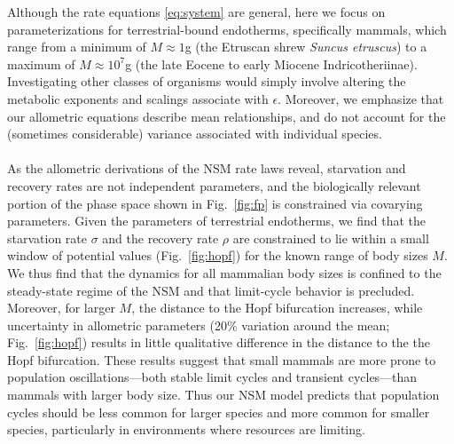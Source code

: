 \documentclass{pnastwo}
\begin{document}
\begin{article}

Although the rate equations \eqref{eq:system} are general, here we focus on
parameterizations for terrestrial-bound endotherms, specifically mammals,
which range from a minimum of $M\approx1$g (the Etruscan shrew
\emph{Suncus etruscus}) to a maximum of $M\approx10^7$g (the late Eocene
to early Miocene Indricotheriinae).  Investigating other classes of organisms
would simply involve altering the metabolic exponents and scalings associate
with $\epsilon$. Moreover, we emphasize that our allometric equations
describe mean relationships, and do not account for the (sometimes
considerable) variance associated with individual species.
\\

 \\
As the allometric derivations of the NSM rate laws reveal, starvation and recovery rates are not independent parameters, and the biologically relevant portion of the phase space shown in Fig.~\ref{fig:fp} is constrained via covarying parameters.
Given the parameters of terrestrial endotherms, we find that the starvation rate $\sigma$ and the recovery rate $\rho$ are constrained to lie within a small window of potential values (Fig.~\ref{fig:hopf}) for the known range of body sizes $M$.
We thus find that the dynamics for all mammalian body sizes is confined to the steady-state regime of the NSM and that limit-cycle behavior is precluded.
Moreover, for larger $M$, the distance to the Hopf bifurcation increases, while uncertainty in allometric parameters (20\% variation around the mean; Fig.~\ref{fig:hopf}) results in little qualitative difference in the distance to the the Hopf bifurcation.
These results suggest that small mammals are more prone to population oscillations---both stable limit cycles and transient cycles---than mammals with larger body size.
Thus our NSM model predicts that population cycles should be less common for larger species and more common for smaller species, particularly in environments where resources are limiting.%


\end{article}
\end{document}
